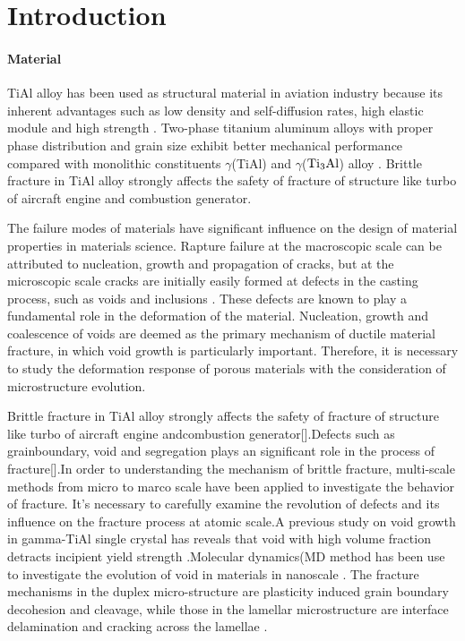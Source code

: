 \documentclass[journal,article,submit,moreauthors,pdftex,10pt,a4paper]{Definitions/mdpi}
\begin{document}
\section{Introduction}
\paragraph{Material}
TiAl alloy has been used as structural material in aviation industry because its inherent advantages such as low density and self-diffusion rates, high elastic module and high strength \cite{vu2013}. Two-phase titanium aluminum alloys with proper phase distribution and grain size exhibit better mechanical performance compared with monolithic constituents $\gamma$(TiAl) and $\gamma$($\rm Ti_3Al$) alloy \cite{}. Brittle fracture in TiAl alloy strongly affects the safety of fracture of structure like turbo of aircraft engine and combustion generator. 
	
The failure modes of materials have significant influence on the design of material properties in materials science. Rapture failure at the macroscopic scale can be attributed to nucleation, growth and propagation of cracks, but at the microscopic scale cracks are initially easily formed at defects in the casting process, such as voids and inclusions \cite{}. These defects are known to play a fundamental role in the deformation of the material. Nucleation, growth and coalescence of voids are deemed as the primary mechanism of ductile material fracture, in which void growth is particularly important. Therefore, it is necessary to study the deformation response of porous materials with the consideration of microstructure evolution.

Brittle fracture in TiAl alloy strongly affects the safety of fracture of structure like turbo of aircraft engine andcombustion generator[].Defects such as grainboundary, void and segregation plays an significant role in the process of fracture[].In order to understanding the mechanism of brittle fracture, multi-scale methods from micro to marco scale have been applied to investigate the behavior of fracture. It's necessary to carefully examine the revolution of defects and its influence on the fracture process at atomic scale.A previous study on void growth in gamma-TiAl single crystal has reveals that void with high volume fraction detracts incipient yield strength \cite{}.Molecular dynamics(MD method has been use to investigate the evolution of void in materials in nanoscale \cite{}. The fracture mechanisms in the duplex micro-structure are plasticity induced grain boundary decohesion and cleavage, while those in the lamellar microstructure are interface delamination and cracking across the lamellae \cite{}.
	
\end{document}
